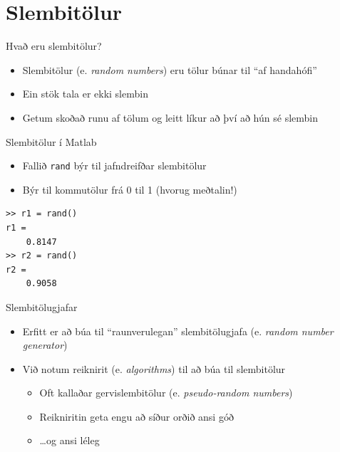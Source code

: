 \documentclass[handout]{beamer}
\begin{document}
\section{Slembitölur}

\begin{frame}{Hvað eru slembitölur?}
\begin{itemize}
 \item Slembitölur (e. \emph{random numbers}) eru tölur búnar til ``af handahófi''
 \item Ein stök tala er ekki slembin
 \item Getum skoðað runu af tölum og leitt líkur að því að hún sé slembin
\end{itemize}
\end{frame}

\begin{frame}[fragile]{Slembitölur í Matlab}
\begin{itemize}
 \item Fallið \texttt{rand} býr til jafndreifðar slembitölur
 \item Býr til kommutölur frá 0 til 1 (hvorug meðtalin!)
\end{itemize}
\begin{verbatim}
>> r1 = rand()
r1 =
    0.8147
>> r2 = rand()
r2 =
    0.9058
\end{verbatim}
\end{frame}

\begin{frame}{Slembitölugjafar}
\begin{itemize}
 \item Erfitt er að búa til ``raunverulegan'' slembitölugjafa (e. \emph{random number generator})
 \item Við notum reiknirit (e. \emph{algorithms}) til að búa til slembitölur
 \begin{itemize}
  \item Oft kallaðar gervislembitölur (e. \emph{pseudo-random numbers})
  \item Reikniritin geta engu að síður orðið ansi góð \pause
  \item \ldots og ansi léleg
 \end{itemize}
\end{itemize}
\end{frame}
\end{document}
